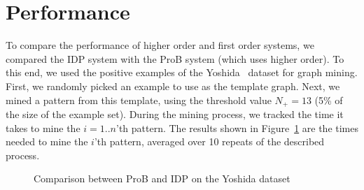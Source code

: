\section{Performance}\label{sec:performance}
To compare the performance of higher order and first order systems, we compared the IDP system with the ProB system (which uses higher order).
To this end, we used the positive examples of the Yoshida~\citep{?} dataset for graph mining.
First, we randomly picked an example to use as the template graph.
Next, we mined a pattern from this template, using the threshold value $N_{+} = 13$ (5\% of the size of the example set).
During the mining process, we tracked the time it takes to mine the $i=1..n$'th pattern.
The results shown in Figure~\ref{fig:ProBIDPComp} are the times needed to mine the $i$'th pattern, averaged over 10 repeats of the described process.

\begin{figure}
\caption{Comparison between ProB and IDP on the Yoshida dataset\label{fig:ProBIDPComp}}
\end{figure}



